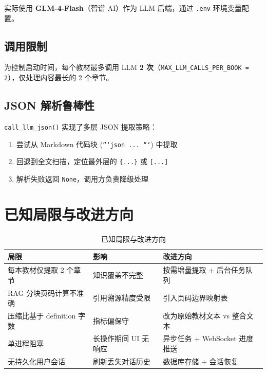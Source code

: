 \documentclass[12pt,a4paper]{article}
\begin{document}
实际使用 \textbf{GLM-4-Flash}（智谱 AI）作为 LLM 后端，通过 \texttt{.env} 环境变量配置。

\subsection{调用限制}

为控制启动时间，每个教材最多调用 LLM \textbf{2 次}（\texttt{MAX\_LLM\_CALLS\_PER\_BOOK = 2}），仅处理内容最长的 2 个章节。

\subsection{JSON 解析鲁棒性}

\texttt{call\_llm\_json()} 实现了多层 JSON 提取策略：
\begin{enumerate}[leftmargin=2em]
    \item 尝试从 Markdown 代码块 (\texttt{```json ... ```}) 中提取
    \item 回退到全文扫描，定位最外层的 \texttt{\{...\}} 或 \texttt{[...]}
    \item 解析失败返回 \texttt{None}，调用方负责降级处理
\end{enumerate}

\section{已知局限与改进方向}
\label{sec:limitations}

\begin{table}[H]
\centering
\caption{已知局限与改进方向}
\begin{tabularx}{\textwidth}{>{\raggedright\arraybackslash}p{3.5cm} >{\raggedright\arraybackslash}p{4cm} X}
\toprule
\textbf{局限} & \textbf{影响} & \textbf{改进方向} \\
\midrule
每本教材仅提取 2 个章节 & 知识覆盖不完整 & 按需增量提取 + 后台任务队列 \\
RAG 分块页码计算不准确 & 引用溯源精度受限 & 引入页码边界映射表 \\
压缩比基于 definition 字数 & 指标偏保守 & 改为原始教材文本 vs 整合文本 \\
单进程阻塞 & 长操作期间 UI 无响应 & 异步任务 + WebSocket 进度推送 \\
无持久化用户会话 & 刷新丢失对话历史 & 数据库存储 + 会话恢复 \\
\bottomrule
\end{tabularx}
\end{table}
\end{document}
